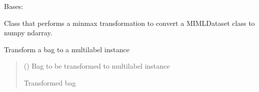 \documentclass[letterpaper,10pt,english]{sphinxmanual}
\begin{document}
\begin{fulllineitems}
\label{\detokenize{transformation/mimlTOml/_autosummary/miml.transformation.mimlTOml.minmax.MinMaxTransformation:miml.transformation.mimlTOml.minmax.MinMaxTransformation}}
\pysigstartsignatures
\pysigline
{}
\pysigstopsignatures
\sphinxAtStartPar
Bases: {\hyperref[\detokenize{transformation/mimlTOml/_autosummary/miml.transformation.mimlTOml.miml_to_ml_transformation.MIMLtoMLTransformation:miml.transformation.mimlTOml.miml_to_ml_transformation.MIMLtoMLTransformation}]{}}

\sphinxAtStartPar
Class that performs a minmax transformation to convert a MIMLDataset class to numpy ndarray.

\begin{fulllineitems}
\label{\detokenize{transformation/mimlTOml/_autosummary/miml.transformation.mimlTOml.minmax.MinMaxTransformation:miml.transformation.mimlTOml.minmax.MinMaxTransformation.transform_bag}}
\pysigstartsignatures
\pysiglinewithargsret
{}
{}
{}
\pysigstopsignatures
\sphinxAtStartPar
Transform a bag to a multilabel instance
\begin{quote}\begin{description}
\sphinxAtStartPar
{} ({\hyperref[\detokenize{data/_autosummary/miml.data.bag.Bag:miml.data.bag.Bag}]{}}) \textendash{} Bag to be transformed to multilabel instance

\sphinxAtStartPar
{} \textendash{} Transformed bag

\sphinxAtStartPar
{\hyperref[\detokenize{data/_autosummary/miml.data.bag.Bag:miml.data.bag.Bag}]{}}

\end{description}\end{quote}


\end{fulllineitems}
\end{fulllineitems}
\end{document}
